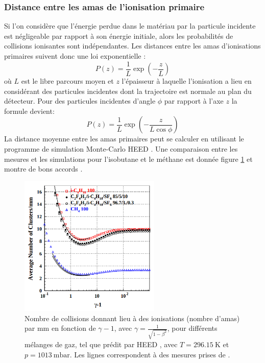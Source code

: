 \subsubsection{Distance entre les amas de l'ionisation primaire}
Si l'on considère que l'énergie perdue dans le matériau par la particule incidente est négligeable par rapport à son énergie initiale, alors les probabilités de collisions ionisantes sont indépendantes. Les distances entre les amas d'ionisations primaires suivent donc une loi exponentielle :
\begin{equation}
P(z)=\frac{1}{L}\exp\left(-\frac{z}{L}\right)
\end{equation} 
où $L$ est le libre parcours moyen et $z$ l'épaisseur à laquelle l'ionisation a lieu en considérant des particules incidentes dont la trajectoire est normale au plan du détecteur. Pour des particules incidentes d'angle $\phi$ par rapport à l'axe $z$ la formule devient:
\begin{equation}
P(z)=\frac{1}{L}\exp\left(-\frac{z}{L\cos\phi}\right)
\end{equation}
La distance moyenne entre les amas primaires peut se calculer en utilisant le programme de simulation Monte-Carlo HEED \cite{HEED}. Une comparaison entre les mesures et les simulations pour l'isobutane et le méthane est donnée figure \ref{lambda} et montre de bons accords \cite{2004NIMPA}.  

\begin{figure}[ht!]
	\centering
	\includegraphics[width=0.60\textwidth]{RPC/lambda.png}
	\captionsetup{type=figure}\caption{Nombre de collisions donnant lieu à des ionisations (nombre d'amas) par \si{\milli\meter} en fonction de $\gamma-1$, avec $\gamma=\frac{1}{\sqrt{1-\beta^{2}}}$, pour différents mélanges de gaz, tel que prédit par HEED \cite{HEED}, avec $T=\SI{296.15}{\kelvin}$ et $p=\SI{1013}{\milli\bar}$. Les lignes correspondent à des mesures prises de \cite{PhysRevA.6.1507}.  }
	\label{lambda}
\end{figure}

